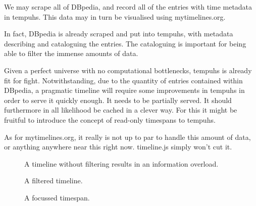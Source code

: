 We may scrape all of DBpedia, and record all of the entries with time metadata 
in tempuhs. This data may in turn be visualised using mytimelines.org.

In fact, DBpedia is already scraped and put into tempuhs, with metadata 
describing and cataloguing the entries. The cataloguing is important for being
able to filter the immense amounts of data.

Given a perfect universe with no computational bottlenecks, tempuhs is already 
fit for fight. Notwithstanding, due to the quantity of entries contained 
within DBpedia, a pragmatic timeline will require some improvements in tempuhs 
in order to serve it quickly enough. It needs to be partially served. It 
should furthermore in all likelihood be cached in a clever way. For this it 
might be fruitful to introduce the concept of read-only timespans to tempuhs.

As for mytimelines.org, it really is not up to par to handle this amount of 
data, or anything anywhere near this right now. timeline.js simply won't cut 
it.

\begin{figure*}
  \centering
  \begin{scale}{0.7}
    
  \end{scale}
  \caption{A timeline without filtering results in an information overload.}
  \label{fig:overload}
\end{figure*}

\begin{figure*}
  \centering
  \begin{scale}{0.7}
    
  \end{scale}
  \caption{A filtered timeline.}
  \label{fig:filtered}
\end{figure*}

\begin{figure*}
  \centering
  \begin{scale}{0.7}
    
  \end{scale}
  \caption{A focussed timespan.}
  \label{fig:focussed}
\end{figure*}
